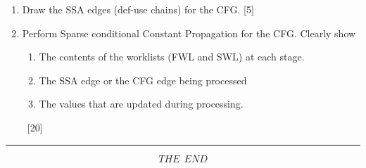 \documentclass[12pt]{article}
\begin{document}
\begin{enumerate}
\begin{enumerate}
\item Draw the SSA edges (def-use chains) for the CFG. \hfill[5]
\item Perform Sparse conditional Constant Propagation for the CFG. Clearly show
\begin{enumerate}
\item The contents of the worklists (FWL and SWL) at each stage.
\item The SSA edge or the CFG edge being processed
\item The values that are updated during processing.
\end{enumerate}~\hfill[20]
\end{enumerate}
\end{enumerate}
\hrule
\[ T H E ~~ E N D \]
\end{document}
